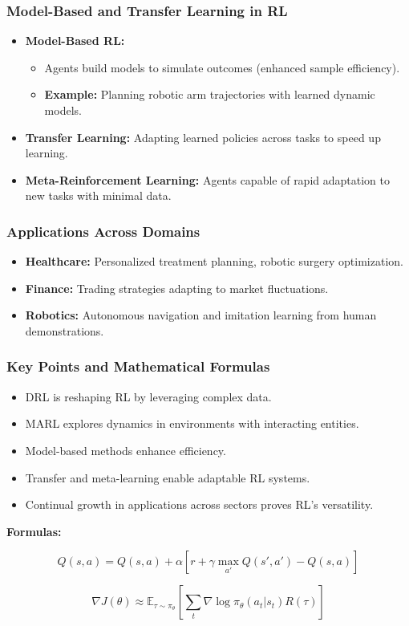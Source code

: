 \documentclass[aspectratio=169]{beamer}
\begin{document}
\begin{frame}[fragile]
    \frametitle{Model-Based and Transfer Learning in RL}
    \begin{itemize}
        \item \textbf{Model-Based RL:}
            \begin{itemize}
                \item Agents build models to simulate outcomes (enhanced sample efficiency).
                \item \textbf{Example:} Planning robotic arm trajectories with learned dynamic models.
            \end{itemize}
        \item \textbf{Transfer Learning:} Adapting learned policies across tasks to speed up learning.
        \item \textbf{Meta-Reinforcement Learning:} Agents capable of rapid adaptation to new tasks with minimal data.
    \end{itemize}
\end{frame}

\begin{frame}[fragile]
    \frametitle{Applications Across Domains}
    \begin{itemize}
        \item \textbf{Healthcare:} Personalized treatment planning, robotic surgery optimization.
        \item \textbf{Finance:} Trading strategies adapting to market fluctuations.
        \item \textbf{Robotics:} Autonomous navigation and imitation learning from human demonstrations.
    \end{itemize}
\end{frame}

\begin{frame}[fragile]
    \frametitle{Key Points and Mathematical Formulas}
    \begin{itemize}
        \item DRL is reshaping RL by leveraging complex data.
        \item MARL explores dynamics in environments with interacting entities.
        \item Model-based methods enhance efficiency.
        \item Transfer and meta-learning enable adaptable RL systems.
        \item Continual growth in applications across sectors proves RL's versatility.
    \end{itemize}
    
    \textbf{Formulas:}

    \begin{equation}
    Q(s, a) = Q(s, a) + \alpha \left[r + \gamma \max_{a'} Q(s', a') - Q(s, a)\right]
    \end{equation}
    
    \begin{equation}
    \nabla J(\theta) \approx \mathbb{E}_{\tau \sim \pi_\theta} \left[ \sum_t \nabla \log \pi_\theta(a_t | s_t) R(\tau) \right]
    \end{equation}
\end{frame}
\end{document}
